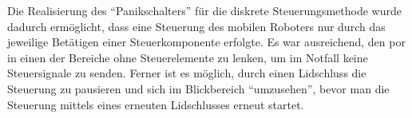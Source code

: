 Die Realisierung des \enquote{Panikschalters} für die diskrete Steuerungsmethode wurde dadurch ermöglicht, dass eine Steuerung des mobilen Roboters nur durch das jeweilige Betätigen einer Steuerkomponente erfolgte. Es war ausreichend, den \acs{por} in einen der Bereiche ohne Steuerelemente zu lenken, um im Notfall keine Steuersignale zu senden. Ferner ist es möglich, durch einen Lidschluss die Steuerung zu pausieren und sich im Blickbereich \enquote{umzusehen}, bevor man die Steuerung mittels eines erneuten Lidschlusses erneut startet. 

